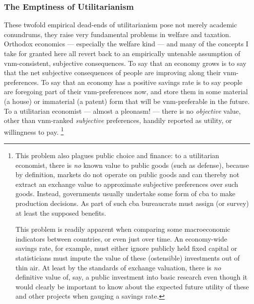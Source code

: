 \subsubsection[Emptiness]{The Emptiness of Utilitarianism}
	\label{sec:emptiness}
These twofold empirical dead-ends of utilitarianism pose not merely academic conundrums, they raise very fundamental problems in welfare and taxation.
Orthodox economics --- especially the welfare kind --- and many of the concepts I take for granted here all revert back to an empirically untenable assumption of \gls{vnm}-consistent, subjective consequences.
To say that an economy grows is to say that the net subjective consequences of people are improving along their \gls{vnm}-preferences.
To say that an economy has a positive savings rate is to say people are foregoing part of their \gls{vnm}-preferences now, and store them in some material (a house) or immaterial (a patent) form that will be \gls{vnm}-preferable in the future.
To a utilitarian economist --- almost a pleonasm! --- there is no \emph{objective} value, other than \gls{vnm}-ranked \emph{subjective} preferences, handily reported as utility, or willingness to pay.
\footnote{
	This problem also plagues public choice and finance:
	to a utilitarian economist, there is \emph{no} known value to public goods (such as defense), because by definition, markets do not operate on public goods and can thereby not extract an exchange value to approximate subjective preferences over such goods.
	Instead, governments usually undertake some form of \gls{cba} to make production decisions.
	As part of such \gls{cba} bureaucrats must assign (or survey) at least the supposed benefits.

	This problem is readily apparent when comparing some macroeconomic indicators between countries, or even just over time.
	An economy-wide savings rate, for example, must either ignore publicly held fixed capital %
	or statisticians must impute the value of these (ostensible) investments out of thin air.
	At least by the standards of exchange valuation, there is \emph{no} definitive value of, say, a public investment into basic research even though it would clearly be important to know about the expected future utility of these and other projects when gauging a savings rate.
}
